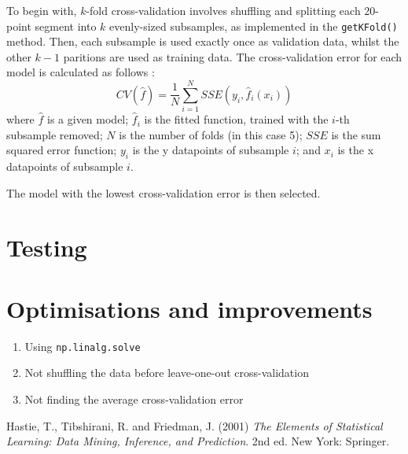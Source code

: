 \documentclass[onecolumn, 12pt, a4paper]{article}
\begin{document}
To begin with, $k$-fold cross-validation involves shuffling and 
splitting each 20-point segment into $k$ evenly-sized subsamples,
as implemented in the \texttt{getKFold()} method.
Then, each subsample is used exactly once as validation data,
whilst the other $k - 1$ paritions are used as training data.
The cross-validation error for each model is calculated
as follows \cite{EOSL}:
\[
    CV({\hat{f}}) = \frac{1}{N}\sum_{i = 1}^{N}SSE(y_{i}, \hat{f}_{i}(x_{i}))
\]
where
$\hat{f}$ is a given model;
$\hat{f}_{i}$ is the fitted function, trained with the $i$-th subsample removed;
$N$ is the number of folds (in this case 5);
$SSE$ is the sum squared error function;
$y_{i}$ is the y datapoints of subsample $i$;
and $x_{i}$ is the x datapoints of subsample $i$.

The model with the lowest cross-validation error is then selected.

\section{Testing}

\section{Optimisations and improvements}

\begin{enumerate}
    \item{Using \texttt{np.linalg.solve}}
    \item{Not shuffling the data before leave-one-out cross-validation}
    \item{Not finding the average cross-validation error}
\end{enumerate}

\begin{thebibliography}{9}
    Hastie, T., Tibshirani, R. and Friedman, J. (2001)
    \textit{The Elements of Statistical Learning: Data Mining, Inference, and Prediction}. 
    2nd ed. New York: Springer.
\end{thebibliography}
    
\end{document}

